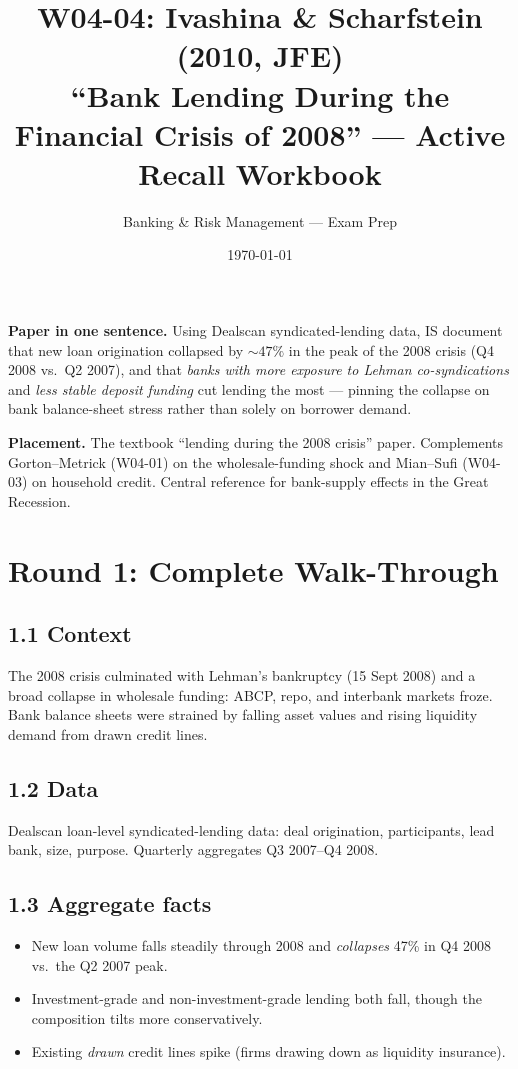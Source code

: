 \documentclass[11pt]{article}
\title{W04-04: Ivashina \& Scharfstein (2010, JFE) \\
\large ``Bank Lending During the Financial Crisis of 2008'' --- Active Recall Workbook}
\author{Banking \& Risk Management --- Exam Prep}
\date{\today}
\begin{document}
\maketitle

\begin{keybox}
\textbf{Paper in one sentence.} Using Dealscan syndicated-lending data, IS document that new loan origination collapsed by $\sim 47\%$ in the peak of the 2008 crisis (Q4 2008 vs.\ Q2 2007), and that \emph{banks with more exposure to Lehman co-syndications} and \emph{less stable deposit funding} cut lending the most --- pinning the collapse on bank balance-sheet stress rather than solely on borrower demand.

\textbf{Placement.} The textbook ``lending during the 2008 crisis'' paper. Complements Gorton--Metrick (W04-01) on the wholesale-funding shock and Mian--Sufi (W04-03) on household credit. Central reference for bank-supply effects in the Great Recession.
\end{keybox}

\section*{Round 1: Complete Walk-Through}

\subsection*{1.1 Context}
The 2008 crisis culminated with Lehman's bankruptcy (15 Sept 2008) and a broad collapse in wholesale funding: ABCP, repo, and interbank markets froze. Bank balance sheets were strained by falling asset values and rising liquidity demand from drawn credit lines.

\subsection*{1.2 Data}
Dealscan loan-level syndicated-lending data: deal origination, participants, lead bank, size, purpose. Quarterly aggregates Q3 2007--Q4 2008.

\subsection*{1.3 Aggregate facts}
\begin{itemize}
\item New loan volume falls steadily through 2008 and \emph{collapses} 47\% in Q4 2008 vs.\ the Q2 2007 peak.
\item Investment-grade and non-investment-grade lending both fall, though the composition tilts more conservatively.
\item Existing \emph{drawn} credit lines spike (firms drawing down as liquidity insurance).
\end{itemize}
\end{document}
